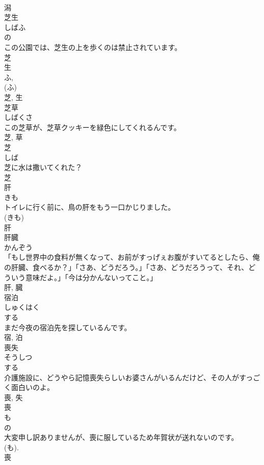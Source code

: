 \documentclass[8pt]{extreport}
\begin{document}
\begin{CJK}{UTF8}{min}
\\	潟	
\\	芝生	
\\	しばふ	
\\	の 
\\	この公園では、芝生の上を歩くのは禁止されています。	
\\	芝 
\\	生 
\\	ふ, 
\\	(ふ) 
\\	芝, 生	
\\	芝草	
\\	しばくさ	
\\	この芝草が、芝草クッキーを緑色にしてくれるんです。	
\\	芝, 草	
\\	芝	
\\	しば	
\\	芝に水は撒いてくれた？	
\\	芝	
\\	肝	
\\	きも	
\\	トイレに行く前に、鳥の肝をもう一口かじりました。	
\\	(きも) 
\\	肝	
\\	肝臓	
\\	かんぞう	
\\	「もし世界中の食料が無くなって、お前がすっげぇお腹がすいてるとしたら、俺の肝臓、食べるか？」「さあ、どうだろう。」「さあ、どうだろうって、それ、どういう意味だよ。」「今は分かんないってこと。」	
\\	肝, 臓	
\\	宿泊	
\\	しゅくはく	
\\	する 
\\	まだ今夜の宿泊先を探しているんです。	
\\	宿, 泊	
\\	喪失	
\\	そうしつ	
\\	する 
\\	介護施設に、どうやら記憶喪失らしいお婆さんがいるんだけど、その人がすっごく面白いのよ。	
\\	喪, 失	
\\	喪	
\\	も	
\\	の 
\\	大変申し訳ありませんが、喪に服しているため年賀状が送れないのです。	
\\	(も). 
\\	喪	

\end{CJK}
\end{document}
